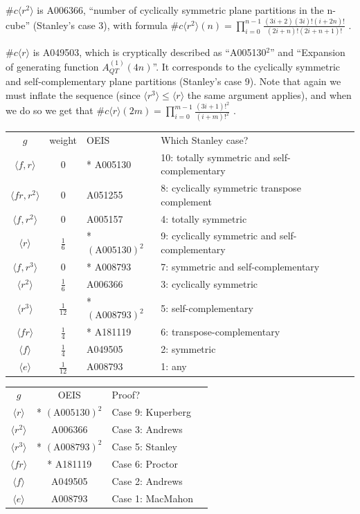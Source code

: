 \documentclass[11pt,a4paper]{article}
\theoremstyle{remark}
\begin{document}
$\#c\langle r^2\rangle$ is A006366, ``number of cyclically symmetric plane partitions in the n-cube'' (Stanley's case 3), with formula $\#c\langle r^2\rangle(n) = \prod_{i=0}^{n-1} \frac{(3i+2)(3i)!(i+2n)!}{(2i+n)!(2i+n+1)!}$ \cite{Andrews79}.

$\#c\langle r\rangle$ is A049503, which is cryptically described as ``A005130$^2$'' and ``Expansion of generating function $A_{QT}^{(1)}(4n)$''. It corresponds to the cyclically symmetric and self-complementary plane partitions (Stanley's case 9). Note that again we must inflate the sequence (since $\langle r^3\rangle \le \langle r\rangle$ the same argument applies), and when we do so we get that $\#c\langle r\rangle(2m) = \prod_{i=0}^{m-1} \frac{(3i+1)!^2}{(i+m)!^2}$ \cite{Kuperberg94}.

\iffalse
\begin{tabular}{ccll}
$g$                     & weight       & OEIS & Which Stanley case? \\
$\langle f,r\rangle$    & $0$          & * A005130 & 10: totally symmetric and self-complementary \\
$\langle fr,r^2\rangle$ & $0$          & A051255 & 8: cyclically symmetric transpose complement \\
$\langle f,r^2\rangle$  & $0$          & A005157 & 4: totally symmetric \\
$\langle r\rangle$      & $\frac16$    & * $(\textrm{A005130})^2$ & 9: cyclically symmetric and self-complementary \\
$\langle f,r^3\rangle$  & $0$          & * A008793 & 7: symmetric and self-complementary \\
$\langle r^2\rangle$    & $\frac16$    & A006366 & 3: cyclically symmetric \\
$\langle r^3\rangle$    & $\frac1{12}$ & * $(\textrm{A008793})^2$ & 5: self-complementary \\
$\langle fr\rangle$     & $\frac14$    & * A181119 & 6: transpose-complementary \\
$\langle f\rangle$      & $\frac14$    & A049505 & 2: symmetric \\
$\langle e\rangle$      & $\frac1{12}$ & A008793 & 1: any
\end{tabular}

\begin{tabular}{ccll}
$g$                     & OEIS & Proof? \\
$\langle r\rangle$      & * $(\textrm{A005130})^2$ & Case 9: Kuperberg \cite{Kuperberg94} \\
$\langle r^2\rangle$    & A006366 & Case 3: Andrews \cite{Andrews79} \\
$\langle r^3\rangle$    & * $(\textrm{A008793})^2$ & Case 5: Stanley \cite{Stanley86} \\
$\langle fr\rangle$     & * A181119 & Case 6: Proctor \cite{Proctor88} \\
$\langle f\rangle$      & A049505 & Case 2: Andrews \cite{Andrews78} \\
$\langle e\rangle$      & A008793 & Case 1: MacMahon \cite{MacMahon16}
\end{tabular}
\end{document}
